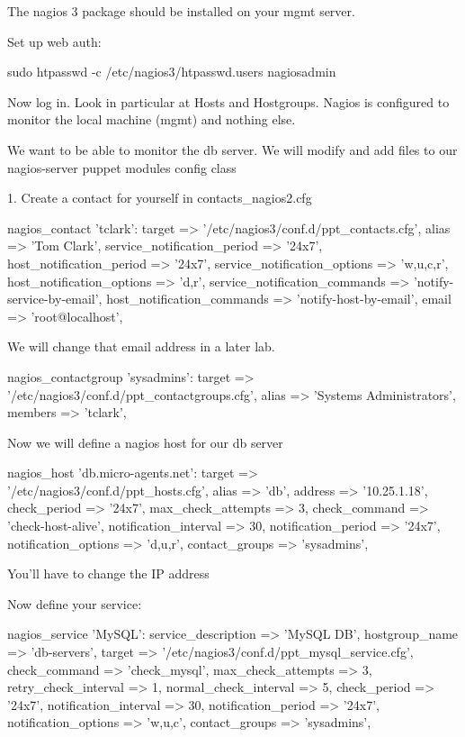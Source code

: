 The nagios 3 package should be installed on your mgmt server.

Set up web auth:

sudo htpasswd -c /etc/nagios3/htpasswd.users nagiosadmin

Now log in.  Look in particular at Hosts and Hostgroups.  Nagios is configured
to monitor the local machine (mgmt) and nothing else.

We want to be able to monitor the db server.  We will modify and add files to
our nagios-server puppet modules config class

1.  Create a contact for yourself in contacts_nagios2.cfg

nagios_contact { 'tclark':
              target => '/etc/nagios3/conf.d/ppt_contacts.cfg',
              alias => 'Tom Clark',
              service_notification_period => '24x7',
              host_notification_period => '24x7',
              service_notification_options => 'w,u,c,r',
              host_notification_options => 'd,r',
              service_notification_commands => 'notify-service-by-email',
              host_notification_commands => 'notify-host-by-email',
              email => 'root@localhost',
  }


We will change that email address in a later lab.


 nagios_contactgroup { 'sysadmins':
               target => '/etc/nagios3/conf.d/ppt_contactgroups.cfg',
               alias => 'Systems Administrators',
               members => 'tclark', 
  }



Now we will define a nagios host for our db server

 nagios_host { 'db.micro-agents.net':
                 target => '/etc/nagios3/conf.d/ppt_hosts.cfg',
                 alias => 'db',
                 address => '10.25.1.18',
                 check_period => '24x7',
                 max_check_attempts => 3,
                 check_command => 'check-host-alive',
                 notification_interval => 30,
                 notification_period => '24x7',
                 notification_options => 'd,u,r',
                 contact_groups => 'sysadmins',
              }

You'll have to change the IP address 

Now define your service:

nagios_service {'MySQL':
              service_description => 'MySQL DB',
              hostgroup_name => 'db-servers',
              target => '/etc/nagios3/conf.d/ppt_mysql_service.cfg',
              check_command => 'check_mysql',
              max_check_attempts => 3,
              retry_check_interval => 1,
              normal_check_interval => 5,
              check_period => '24x7',
              notification_interval => 30,
              notification_period => '24x7',
              notification_options => 'w,u,c',
              contact_groups => 'sysadmins',
  }


